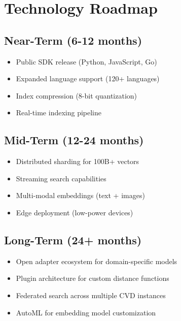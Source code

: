 \section{Technology Roadmap}

\subsection{Near-Term (6-12 months)}
\begin{itemize}[noitemsep]
    \item Public SDK release (Python, JavaScript, Go)
    \item Expanded language support (120+ languages)
    \item Index compression (8-bit quantization)
    \item Real-time indexing pipeline
\end{itemize}

\subsection{Mid-Term (12-24 months)}
\begin{itemize}[noitemsep]
    \item Distributed sharding for 100B+ vectors
    \item Streaming search capabilities
    \item Multi-modal embeddings (text + images)
    \item Edge deployment (low-power devices)
\end{itemize}

\subsection{Long-Term (24+ months)}
\begin{itemize}[noitemsep]
    \item Open adapter ecosystem for domain-specific models
    \item Plugin architecture for custom distance functions
    \item Federated search across multiple CVD instances
    \item AutoML for embedding model customization
\end{itemize}
